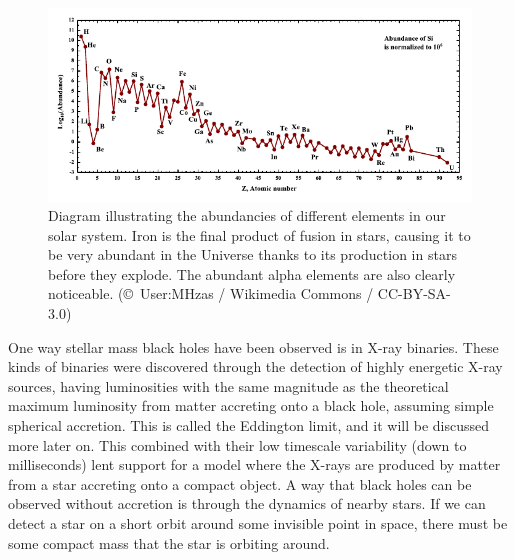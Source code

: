 \documentclass[english, oneside]{HYgradu}
\begin{document}
\begin{figure}
\centering
\includegraphics[width=\textwidth]{../images/SolarSystemAbundances.pdf}
\caption{Diagram illustrating the abundancies of different elements in our solar system. Iron is the final product of fusion in stars, causing it to be very abundant in the Universe thanks to its production in stars before they explode. The abundant alpha elements are also clearly noticeable.
(\copyright \ User:MHz\textasciigrave as / Wikimedia Commons / CC-BY-SA-3.0)}
\label{fig:IronPeak}
\end{figure}

One way stellar mass black holes have been observed is in X-ray binaries. These kinds of binaries were discovered through the detection of highly energetic X-ray sources, having luminosities with the same magnitude as the theoretical maximum luminosity from matter accreting onto a black hole, assuming simple spherical accretion. This is called the Eddington limit, and it will be discussed more later on. This combined with their low timescale variability (down to milliseconds) lent support for a model where the X-rays are produced by matter from a star accreting onto a compact object. A way that black holes can be observed without accretion is through the dynamics of nearby stars. If we can detect a star on a short orbit around some invisible point in space, there must be some compact mass that the star is orbiting around.
\end{document}
